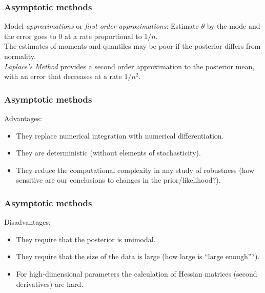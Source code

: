 \documentclass{beamer}
\newcommand{\1}{\ensuremath{\mathbf{1}}}
\begin{document}
%
%
%
\begin{frame}\frametitle{Asymptotic methods}
	Model \emph{approximations} or \emph{first order approximations}: Estimate $\theta$ by the mode and the error goes to 0 at a rate proportional to $1/n$.\\[2ex]
	The estimates of moments and quantiles may be poor if the posterior differs from normality.\\[2ex]
	\emph{Laplace’s Method} provides a second order approximation to the posterior mean, with an error that decreases at a rate $1/n^2$.
\end{frame}
%
%
%
\begin{frame}\frametitle{Asymptotic methods}
	Advantages:
	\begin{itemize}
		\item They replace numerical integration with numerical differentiation.
		\item They are deterministic (without elements of stochasticity).
		\item They reduce the computational complexity in any study of robustness (how sensitive are our conclusions to changes in the prior/likelihood?).
	\end{itemize}
\end{frame}
%
%
%
\begin{frame}\frametitle{Asymptotic methods}
	Disadvantages:
	\begin{itemize}
		\item They require that the posterior is unimodal.
		\item They require that the size of the data is large (how large is ``large enough''?).
		\item For high-dimensional parameters the calculation of Hessian matrices (second derivatives) are hard.
	\end{itemize}
\end{frame}
%
%
%
\end{document}
